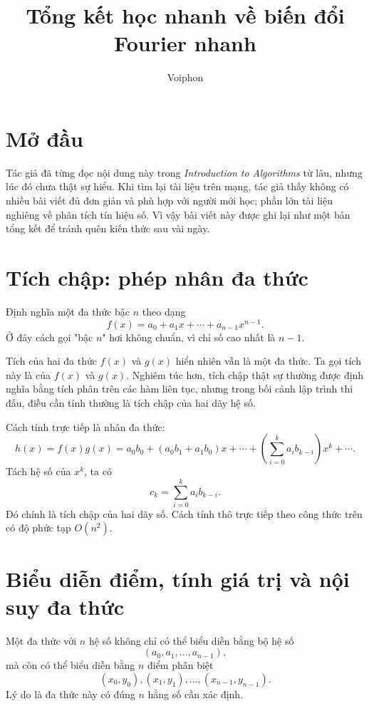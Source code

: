 \documentclass[11pt]{article}
\title{Tổng kết học nhanh về biến đổi Fourier nhanh}
\author{Voiphon}
\date{}
\begin{document}
\maketitle


\section{Mở đầu}

Tác giả đã từng đọc nội dung này trong \textit{Introduction to Algorithms} từ
lâu, nhưng lúc đó chưa thật sự hiểu. Khi tìm lại tài liệu trên mạng, tác giả
thấy không có nhiều bài viết đủ đơn giản và phù hợp với người mới học; phần
lớn tài liệu nghiêng về phân tích tín hiệu số. Vì vậy bài viết này được ghi
lại như một bản tổng kết để tránh quên kiến thức sau vài ngày.

\section{Tích chập: phép nhân đa thức}

Định nghĩa một đa thức bậc $n$ theo dạng
\[
  f(x)=a_0+a_1x+\cdots+a_{n-1}x^{n-1}.
\]
Ở đây cách gọi "bậc $n$" hơi không chuẩn, vì chỉ số cao nhất là $n-1$.

Tích của hai đa thức $f(x)$ và $g(x)$ hiển nhiên vẫn là một đa thức. Ta gọi
tích này là  của $f(x)$ và $g(x)$. Nghiêm túc hơn, tích chập
thật sự thường được định nghĩa bằng tích phân trên các hàm liên tục, nhưng
trong bối cảnh lập trình thi đấu, điều cần tính thường là tích chập của hai
dãy hệ số.

Cách tính trực tiếp là nhân đa thức:
\[
  h(x)=f(x)g(x)
  =a_0b_0+(a_0b_1+a_1b_0)x+\cdots+
  \left(\sum_{i=0}^{k} a_i b_{k-i}\right)x^k+\cdots.
\]
Tách hệ số của $x^k$, ta có
\[
  c_k=\sum_{i=0}^{k} a_i b_{k-i}.
\]
Đó chính là tích chập của hai dãy số. Cách tính thô trực tiếp theo công thức
trên có độ phức tạp $O(n^2)$.

\section{Biểu diễn điểm, tính giá trị và nội suy đa thức}

Một đa thức với $n$ hệ số không chỉ có thể biểu diễn bằng bộ hệ số
\[
  (a_0,a_1,\ldots,a_{n-1}),
\]
mà còn có thể biểu diễn bằng $n$ điểm phân biệt
\[
  (x_0,y_0),(x_1,y_1),\ldots,(x_{n-1},y_{n-1}).
\]
Lý do là đa thức này có đúng $n$ hằng số cần xác định.
\end{document}
